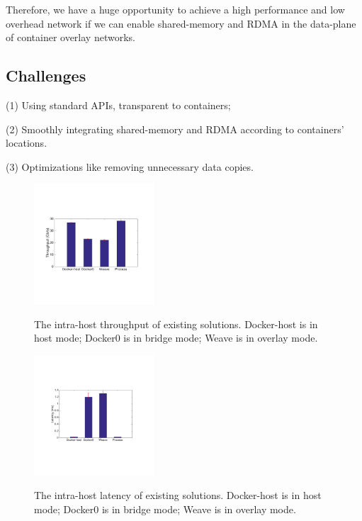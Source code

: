 Therefore, we have a huge opportunity to achieve a high performance
and low overhead network if we can enable shared-memory and RDMA 
in the data-plane of container overlay networks.

\subsection{Challenges}

(1) Using standard APIs, transparent to containers;


(2) Smoothly integrating shared-memory and RDMA according to containers' locations.

(3) Optimizations like removing unnecessary data copies.

\iffalse

\begin{figure}[ht]
     \centering 
     \includegraphics[width=0.4\textwidth]{figures/motivation/eval_exist_bw.pdf} 
     \label{fig:eval_exist_bw}
     \caption{The intra-host throughput of existing solutions. Docker-host is in host mode; Docker0 is in bridge mode; Weave is in overlay mode.} 
\end{figure} 

\begin{figure}[ht]
     \centering 
     \includegraphics[width=0.4\textwidth]{figures/motivation/eval_exist_latency.pdf} 
     \label{fig:eval_exist_latency}
     \caption{The intra-host latency of existing solutions. Docker-host is in host mode; Docker0 is in bridge mode; Weave is in overlay mode.} 
\end{figure} 

